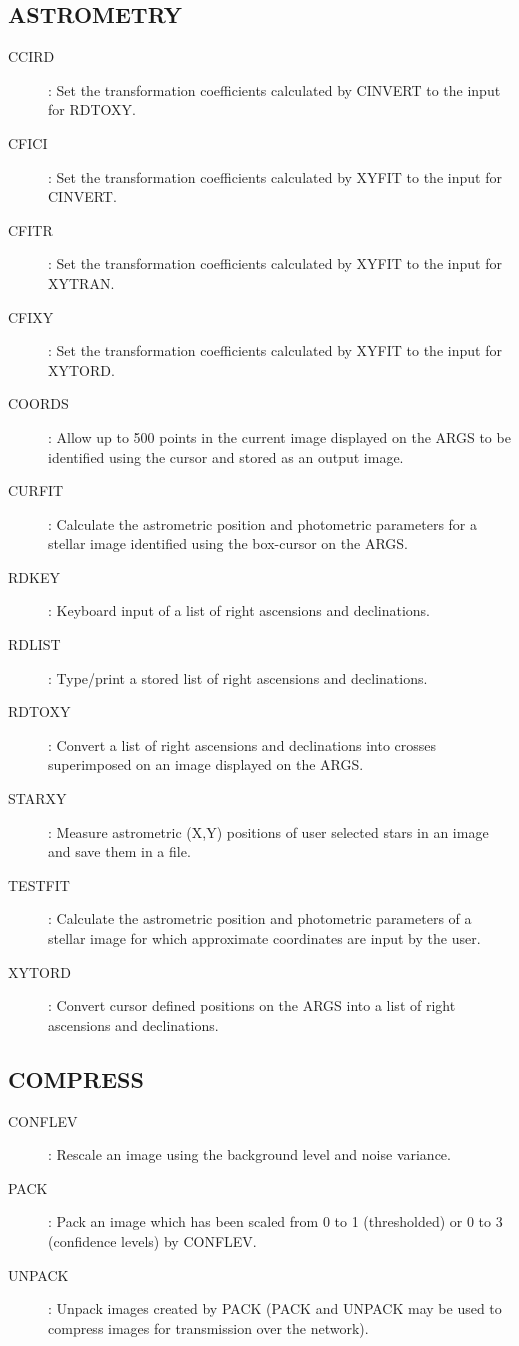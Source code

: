 \subsection {ASTROMETRY}
\begin{description}
\item [CCIRD]: Set the transformation coefficients calculated by CINVERT to the
input for RDTOXY.
\item [CFICI]: Set the transformation coefficients calculated by XYFIT to the
input for CINVERT.
\item [CFITR]: Set the transformation coefficients calculated by XYFIT to the
input for XYTRAN.
\item [CFIXY]: Set the transformation coefficients calculated by XYFIT to the
input for XYTORD.
\item [COORDS]: Allow up to 500 points in the current image displayed on the
ARGS to be identified using the cursor and stored as an output image.
\item [CURFIT]: Calculate the astrometric position and photometric parameters
for a stellar image identified using the box-cursor on the ARGS.
\item [RDKEY]: Keyboard input of a list of right ascensions and declinations.
\item [RDLIST]: Type/print a stored list of right ascensions and declinations.
\item [RDTOXY]: Convert a list of right ascensions and declinations into crosses
superimposed on an image displayed on the ARGS.
\item [STARXY]: Measure astrometric (X,Y) positions of user selected stars in an
image and save them in a file.
\item [TESTFIT]: Calculate the astrometric position and photometric parameters
of a stellar image for which approximate coordinates are input by the user.
\item [XYTORD]: Convert cursor defined positions on the ARGS into a list of
right ascensions and declinations.
\end{description}
\subsection {COMPRESS}
\begin{description}
\item [CONFLEV]: Rescale an image using the background level and noise variance.
\item [PACK]: Pack an image which has been scaled from 0 to 1 (thresholded) or
0 to 3 (confidence levels) by CONFLEV.
\item [UNPACK]: Unpack images created by PACK (PACK and UNPACK may be used to
compress images for transmission over the network).
\end{description}

